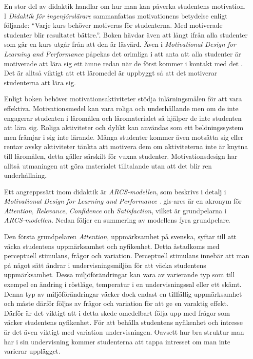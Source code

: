 \documentclass[12pt,a4paper,twoside,openright]{article}
\begin{document}
En stor del av didaktik handlar om hur man kan påverka studentens
motivation. \\I \textit{Didaktik för ingenjörslärare} sammanfattas
motivationens betydelse enligt följande: ``Varje kurs behöver
motiveras för studenterna. Med motiverade studenter blir resultatet
bättre.''.  Boken hävdar även att långt ifrån alla studenter som går
en kurs utgår från att den är läsvärd. Även i \textit{Motivational
  Design for Learning and Performance} påpekas det orimliga i att anta
att alla studenter är motiverade att lära sig ett ämne redan när de
först kommer i kontakt med det \cite{motivational_design}. Det är
alltså viktigt att ett läromedel är uppbyggt så att det motiverar
studenterna att lära sig.

Enligt boken behöver motivations\-aktiviteter stödja inlärningsmålen
för att vara effektiva. Motivationsmedel kan vara roliga och
underhållande men om de inte engagerar studenten i läromålen och
läromaterialet så hjälper de inte studenten att lära sig. Roliga
aktiviteter och dylikt kan användas som ett belöningssystem men
främjar i sig inte lärande. Många studenter kommer även motsätta sig
eller rentav avsky aktiviteter tänkta att motivera dem om
aktiviteterna inte är knytna till läromålen, detta gäller särskilt för
vuxna studenter.  Motivationsdesign har alltså utmaningen att göra
materialet tilltalande utan att det blir ren underhållning.

Ett angreppssätt inom didaktik är \textit{ARCS-modellen}, som beskrivs
i detalj i \textit{Motivational Design for Learning and Performance}
\cite{motivational_design}. \gls{gls-arcs} är en akronym för
\textit{Attention}, \textit{Relevance}, \textit{Confidence} och
\textit{Satisfaction}, vilket är grundpelarna i
\textit{ARCS-modellen}. Nedan följer en summering av modellens fyra
grundpelare.

Den första grundpelaren \textit{Attention}, uppmärksamhet på svenska,
syftar till att väcka studentens uppmärksamhet och nyfikenhet.  Detta
åstadkoms med perceptuell stimulans, frågor och variation.
Perceptuell stimulans innebär att man på något sätt ändrar i
undervisningsmiljön för att väcka studentens uppmärksamhet. Dessa
miljöförändringar kan vara av varierande typ som till exempel en
ändring i röstläge, temperatur i en undervisningssal eller ett skämt.
Denna typ av miljöförändringar väcker dock endast en tillfällig
uppmärksamhet och måste därför följas av frågor och variation för att
ge en varaktig effekt. Därför är det viktigt att i detta skede
omedelbart följa upp med frågor som väcker studentens nyfikenhet. För
att behålla studentens nyfikenhet och intresse är det även viktigt med
variation undervisningen. Oavsett hur bra struktur man har i sin
undervisning kommer studenterna att tappa intresset om man inte
varierar upplägget.
\end{document}
